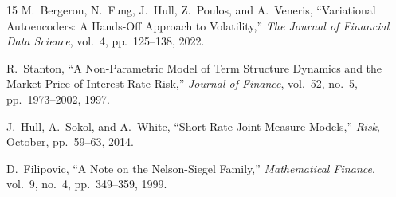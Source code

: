 \documentclass[10pt,a4paper]{article}
\theoremstyle{plain}
\theoremstyle{definition}
\begin{document}
\begin{thebibliography}{15}
 M.~Bergeron, N.~Fung, J.~Hull, Z.~Poulos, and A.~Veneris, ``Variational Autoencoders: A Hands-Off Approach to Volatility,'' \textit{The Journal of Financial Data Science}, vol.~4, pp.~125--138, 2022.

 R.~Stanton, ``A Non-Parametric Model of Term Structure Dynamics and the Market Price of Interest Rate Risk,'' \textit{Journal of Finance}, vol.~52, no.~5, pp.~1973--2002, 1997.

 J.~Hull, A.~Sokol, and A.~White, ``Short Rate Joint Measure Models,'' \textit{Risk}, October, pp.~59--63, 2014.

 D.~Filipovic, ``A Note on the Nelson-Siegel Family,'' \textit{Mathematical Finance}, vol.~9, no.~4, pp.~349--359, 1999.

\end{thebibliography}
\end{document}
